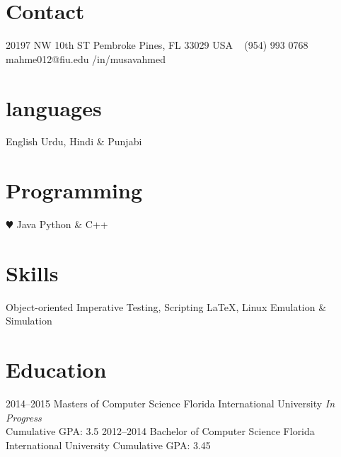 \documentclass[]{friggeri-cv} %
\begin{document}


\begin{aside} %
\section{Contact}
20197 NW 10th ST
Pembroke Pines, FL 33029 
USA
~
(954) 993 0768 
~
mahme012@fiu.edu
/in/musavahmed
\section{languages}
English
Urdu, Hindi \& Punjabi 
\section{Programming}
{\color{red} $\varheartsuit$} Java
Python \& C++ 
\section{Skills}
Object-oriented
Imperative
Testing, Scripting
LaTeX, Linux 
Emulation \& Simulation
\end{aside}


\section{Education}

\begin{entrylist}
\entry
{2014--2015}
{Masters {\normalfont of Computer Science}}
{Florida International University}
{\emph{In Progress} \\
Cumulative GPA: 3.5}
\entry
{2012--2014}
{Bachelor {\normalfont of Computer Science}}
{Florida International University}
{Cumulative GPA: 3.45}
\end{entrylist}
\end{document}
